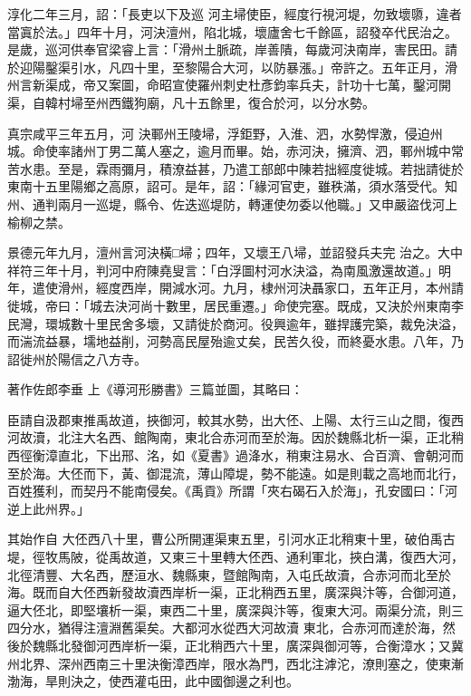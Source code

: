 \begin{pinyinscope}
 淳化二年三月，詔：「長吏以下及巡
 河主埽使臣，經度行視河堤，勿致壞隳，違者當寘於法。」四年十月，河決澶州，陷北城，壞廬舍七千餘區，詔發卒代民治之。是歲，巡河供奉官梁睿上言：「滑州土脈疏，岸善隤，每歲河決南岸，害民田。請於迎陽鑿渠引水，凡四十里，至黎陽合大河，以防暴漲。」帝許之。五年正月，滑州言新渠成，帝又案圖，命昭宣使羅州刺史杜彥鈞率兵夫，計功十七萬，鑿河開渠，自韓村埽至州西鐵狗廟，凡十五餘里，復合於河，以分水勢。



 真宗咸平三年五月，河
 決鄆州王陵埽，浮鉅野，入淮、泗，水勢悍激，侵迫州城。命使率諸州丁男二萬人塞之，逾月而畢。始，赤河決，擁濟、泗，鄆州城中常苦水患。至是，霖雨彌月，積潦益甚，乃遣工部郎中陳若拙經度徙城。若拙請徙於東南十五里陽鄉之高原，詔可。是年，詔：「緣河官吏，雖秩滿，須水落受代。知州、通判兩月一巡堤，縣令、佐迭巡堤防，轉運使勿委以他職。」又申嚴盜伐河上榆柳之禁。



 景德元年九月，澶州言河決橫□埽；四年，又壞王八埽，並詔發兵夫完
 治之。大中祥符三年十月，判河中府陳堯叟言：「白浮圖村河水決溢，為南風激還故道。」明年，遣使滑州，經度西岸，開減水河。九月，棣州河決聶家口，五年正月，本州請徙城，帝曰：「城去決河尚十數里，居民重遷。」命使完塞。既成，又決於州東南李民灣，環城數十里民舍多壞，又請徙於商河。役興逾年，雖捍護完築，裁免決溢，而湍流益暴，壖地益削，河勢高民屋殆逾丈矣，民苦久役，而終憂水患。八年，乃詔徙州於陽信之八方寺。



 著作佐郎李垂
 上《導河形勝書》三篇並圖，其略曰：



 臣請自汲郡東推禹故道，挾御河，較其水勢，出大伾、上陽、太行三山之間，復西河故瀆，北注大名西、館陶南，東北合赤河而至於海。因於魏縣北析一渠，正北稍西徑衡漳直北，下出邢、洺，如《夏書》過洚水，稍東注易水、合百濟、會朝河而至於海。大伾而下，黃、御混流，薄山障堤，勢不能遠。如是則載之高地而北行，百姓獲利，而契丹不能南侵矣。《禹貢》所謂「夾右碣石入於海」，孔安國曰：「河逆上此州界。」



 其始作自
 大伾西八十里，曹公所開運渠東五里，引河水正北稍東十里，破伯禹古堤，徑牧馬陂，從禹故道，又東三十里轉大伾西、通利軍北，挾白溝，復西大河，北徑清豐、大名西，歷洹水、魏縣東，暨館陶南，入屯氏故瀆，合赤河而北至於海。既而自大伾西新發故瀆西岸析一渠，正北稍西五里，廣深與汴等，合御河道，逼大伾北，即堅壤析一渠，東西二十里，廣深與汴等，復東大河。兩渠分流，則三四分水，猶得注澶淵舊渠矣。大都河水從西大河故瀆
 東北，合赤河而達於海，然後於魏縣北發御河西岸析一渠，正北稍西六十里，廣深與御河等，合衡漳水；又冀州北界、深州西南三十里決衡漳西岸，限水為門，西北注滹沱，潦則塞之，使東漸渤海，旱則決之，使西灌屯田，此中國御邊之利也。




\end{pinyinscope}
